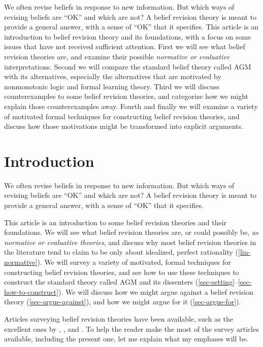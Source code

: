 We often revise beliefs in response to new information. But which ways of revising beliefs are ``OK'' and which are not? A belief revision theory is meant to provide a general answer, with a sense of ``OK'' that it specifies. This article is an introduction to belief revision theory and its foundations, with a focus on some issues that have not received sufficient attention. First we will see what belief revision theories are, and examine their possible {\em normative or evaluative} interpretations. Second we will compare the standard belief theory called AGM with its alternatives, especially the alternatives that are motivated by nonmonotonic logic and formal learning theory. Third we will discuss counterexamples to some belief revision theories, and categorize how we might explain those counterexamples away. Fourth and finally we will examine a variety of motivated formal techniques for constructing belief revision theories, and discuss how those motivations might be transformed into explicit arguments.


\section{Introduction}\label{lin-intro}

We often revise beliefs in response to new information. But which ways of revising beliefs are ``OK'' and which are not? A belief revision theory is meant to provide a general answer, with a sense of ``OK'' that it specifies.

This article is an introduction to some belief revision theories and their foundations. We will see what belief revision theories are, or could possibly be, {\em as normative or evaluative theories}, and discuss why most belief revision theories in the literature tend to claim to be only about idealized, perfect rationality (\autoref{lin-normative}). We will survey a variety of motivated, formal techniques for constructing belief revision theories, and see how to use these techniques to construct the standard theory called AGM and its dissenters (\autoref{sec-setting}--\autoref{sec-how-to-construct}). We will discuss how we might argue against a belief revision theory (\autoref{sec-argue-against}), and how we might argue for it (\autoref{sec-argue-for}). 

Articles surveying belief revision theories have been available, such as the excellent ones by \citet{sep-logic-belief-revision}, \citet*{rodrigues2011belief}, and \citet{huber2013belief-i,huber2013belief-ii}. To help the reader make the most of the survey articles available, including the present one, let me explain what my emphases will be. \op

